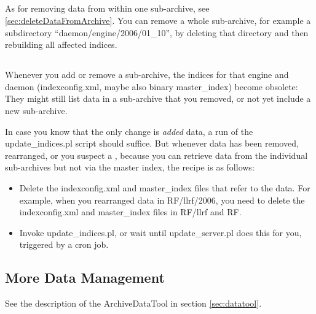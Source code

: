 \subsection{}
As for removing data from within one sub-archive, see 
\ref{sec:deleteDataFromArchive}.
You can remove a whole sub-archive, for example a subdirectory
``daemon/engine/2006/01\_10'', by deleting that directory and then rebuilding
all affected indices.

\subsection{}
Whenever you add or remove a sub-archive, the indices for that engine
and daemon (indexconfig.xml, maybe also binary master\_index)
become obsolete: They might still list data in a
sub-archive that you removed, or not yet include a new
sub-archive.

In case you know that the only change is \emph{added} data, a run of the
update\_indices.pl script should suffice. But whenever data has been
removed, rearranged, or you suspect a ,
because you can retrieve data from the individual sub-archives but not
via the master index, the recipe is as follows:
\begin{itemize}
\item Delete the indexconfig.xml and master\_index files that refer to
      the data. For example, when you rearranged data in RF/llrf/2006,
      you need to delete the indexconfig.xml and master\_index files
      in RF/llrf and RF.
\item Invoke update\_indices.pl, or wait until update\_server.pl
      does this for you, triggered by a cron job.
\end{itemize}

\subsection{More Data Management}
See the description of the ArchiveDataTool in section \ref{sec:datatool}.
